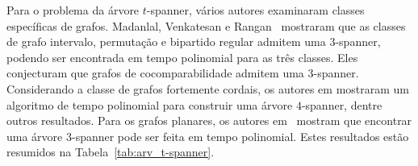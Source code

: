 Para o problema da árvore $t$-spanner, vários autores examinaram classes específicas de grafos.  Madanlal, Venkatesan e Rangan~\cite{MadanlalVR1996} mostraram que as classes de grafo intervalo, permutação e bipartido regular admitem uma $3$-spanner, podendo ser encontrada em tempo polinomial para as três classes. Eles conjecturam que grafos de cocomparabilidade admitem uma $3$-spanner. Considerando a classe de grafos fortemente cordais, os autores em \cite{BrandstadtCD1999} mostraram um algoritmo de tempo polinomial para construir uma árvore $4$-spanner, dentre outros resultados.  Para os grafos planares, os autores em~\cite{FeketeK2001} mostram que encontrar uma árvore $3$-spanner pode ser feita em tempo polinomial.
Estes resultados estão resumidos na Tabela~\ref{tab:arv_t-spanner}.


